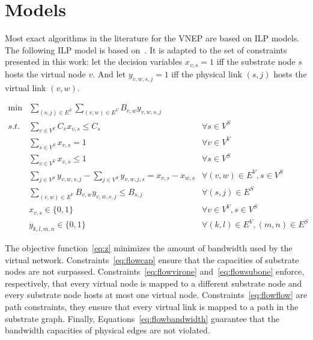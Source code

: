 \section{Models}
\label{sec:models}
Most exact algorithms in the literature for the VNEP are based on ILP models. The following ILP model is based on~\cite{Alkmim2013}. It is adapted to the set of constraints presented in this work: let the decision variables $x_{v,s} = 1$ iff the substrate node $s$ hosts the virtual node $v$. And let $y_{v,w,s,j} = 1$ iff the physical link $(s,j)$ hosts the virtual link $(v,w)$.

\begin{align}
    \min & \sum\limits_{(s,j) \in E^{S}} \sum\limits_{(v,w) \in E^{V}} B_{v,w} y_{v,w,s,j} \label{eq:z} \\
    s.t. & \sum\limits_{v \in V^{V}} C_{v} x_{v,s} \leq C_{s}                     & \forall s \in V^{S}  \label{eq:flowcap} \\
    & \sum\limits_{s \in V^{S}} x_{v,s} = 1                                  & \forall v \in V^{V}  \label{eq:flowvirone}\\
         & \sum\limits_{v \in V^{V}} x_{v,s} \leq 1                               & \forall s \in V^{S} \label{eq:flowsubone}\\
         & \sum\limits_{j \in V^{S}} y_{v,w,s,j} - \sum\limits_{j \in V^{S}} y_{v,w,j,s} =  x_{v,s} - x_{w,s}  & \forall (v,w) \in E^{V}, s \in V^{S}\label{eq:flowflow} \\
         & \sum\limits_{(v,w) \in E^{V}} B_{v,w} y_{v,w,s,j} \leq B_{s,j}  & \forall (s,j) \in E^{S} \label{eq:flowbandwidth} \\
         & x_{v,s} \in \{0,1\} & \forall v \in V^{V}, s \in V^{S} \\
         & y_{k,l,m,n} \in \{0,1\} & \forall (k,l) \in E^{V}, (m,n) \in E^{S}
\end{align}

The objective function~\eqref{eq:z} minimizes the amount of bandwidth used by the virtual network. Constraints~\eqref{eq:flowcap} ensure that the capacities of substrate nodes are not surpassed. Constraints~\eqref{eq:flowvirone} and~\eqref{eq:flowsubone} enforce, respectively, that every virtual node is mapped to a different substrate node and every substrate node hosts at most one virtual node. Constraints~\eqref{eq:flowflow} are path constraints, they ensure that every virtual link is mapped to a path in the substrate graph. Finally, Equations~\eqref{eq:flowbandwidth} guarantee that the bandwidth capacities of physical edges are not violated.

